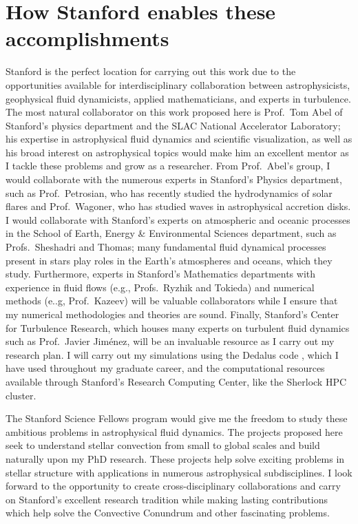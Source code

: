 \documentclass[aps, pre, onecolumn, nofootinbib, notitlepage, groupedaddress, amsfonts, amssymb, amsmath]{revtex4-1}
\begin{document}
\section*{How Stanford enables these accomplishments}
\vspace{-13pt}
Stanford is the perfect location for carrying out this work due to the opportunities available for interdisciplinary collaboration between astrophysicists, geophysical fluid dynamicists, applied mathematicians, and experts in turbulence.
The most natural collaborator on this work proposed here is Prof.~Tom Abel of Stanford's physics department and the SLAC National Accelerator Laboratory; his expertise in astrophysical fluid dynamics and scientific visualization, as well as his broad interest on astrophysical topics would make him an excellent mentor as I tackle these problems and grow as a researcher.
From Prof.~Abel's group, I would collaborate with the numerous experts in Stanford's Physics department, such as Prof.~Petrosian, who has recently studied the hydrodynamics of solar flares and Prof.~Wagoner, who has studied waves in astrophysical accretion disks.
I would collaborate with Stanford's experts on atmospheric and oceanic processes in the School of Earth, Energy \& Environmental Sciences department, such as Profs.~Sheshadri and Thomas; many fundamental fluid dynamical processes present in stars play roles in the Earth's atmospheres and oceans, which they study.
Furthermore, experts in Stanford's Mathematics departments with experience in fluid flows (e.g., Profs.~Ryzhik and Tokieda) and numerical methods (e..g, Prof.~Kazeev) will be valuable collaborators while I ensure that my numerical methodologies and theories are sound.
Finally, Stanford's Center for Turbulence Research, which houses many experts on turbulent fluid dynamics such as Prof.~Javier Jim\'{e}nez, will be an invaluable resource as I carry out my research plan.
I will carry out my simulations using the Dedalus code \citep{burns&all2019}, which I have used throughout my graduate career, and the computational resources available through Stanford's Research Computing Center, like the Sherlock HPC cluster.

The Stanford Science Fellows program would give me the freedom to study these ambitious problems in astrophysical fluid dynamics.
The projects proposed here seek to understand stellar convection from small to global scales and build naturally upon my PhD research.
These projects help solve exciting problems in stellar structure with applications in numerous astrophysical subdisciplines.
I look forward to the opportunity to create cross-disciplinary collaborations and carry on Stanford's excellent research tradition while making lasting contributions which help solve the Convective Conundrum and other fascinating problems. 



\end{document}
